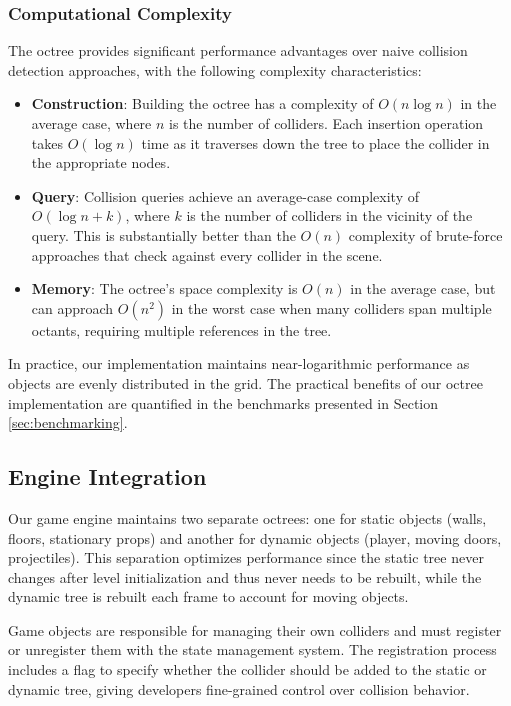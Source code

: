 \documentclass{article}
\begin{document}
\subsubsection{Computational Complexity}
The octree provides significant performance advantages over naive collision detection approaches, with the following complexity characteristics:

\begin{itemize}
    \item \textbf{Construction}: Building the octree has a complexity of $O(n \log n)$ in the average case, where $n$ is the number of colliders. Each insertion operation takes $O(\log n)$ time as it traverses down the tree to place the collider in the appropriate nodes.
    
    \item \textbf{Query}: Collision queries achieve an average-case complexity of $O(\log n + k)$, where $k$ is the number of colliders in the vicinity of the query. This is substantially better than the $O(n)$ complexity of brute-force approaches that check against every collider in the scene.
    
    \item \textbf{Memory}: The octree's space complexity is $O(n)$ in the average case, but can approach $O(n^2)$ in the worst case when many colliders span multiple octants, requiring multiple references in the tree.
\end{itemize}

In practice, our implementation maintains near-logarithmic performance as
objects are evenly distributed in the grid. The practical benefits of our
octree implementation are quantified in the benchmarks presented in Section
\ref{sec:benchmarking}.

\subsection{Engine Integration}
Our game engine maintains two separate octrees: one for static objects (walls,
floors, stationary props) and another for dynamic objects (player, moving
doors, projectiles). This separation optimizes performance since the static
tree never changes after level initialization and thus never needs to be
rebuilt, while the dynamic tree is rebuilt each frame to account for moving
objects.

Game objects are responsible for managing their own colliders and must register
or unregister them with the state management system. The registration process
includes a flag to specify whether the collider should be added to the static
or dynamic tree, giving developers fine-grained control over collision
behavior.
\end{document}
